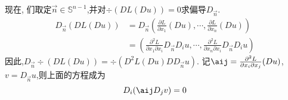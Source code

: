 现在, 们取定$\vec{n} \in \mathbb{S}^{n-1}$,并对$\div(DL(Du))=0$求偏导$D_{\vec{n}}$.
\begin{equation}
    \begin{split}
        D_{\vec{n}}(DL(Du))
        &=D_{\vec{n}}(\frac{\partial L}{\partial x_1}(Du),\cdots,\frac{\partial L}{\partial x_n}(Du))\\
        &=(\frac{\partial^2 L}{\partial x_1 \partial x_i} D_{\vec{n}}D_iu,\cdots,\frac{\partial^2 L}{\partial x_n \partial x_i} D_{\vec{n}}D_iu)
    \end{split}
\end{equation}
因此,$D_{\vec{n}}\div(DL(Du))=\div(D^2L(Du)DD_{\vec{n}}u)$. 记$\aij=\frac{\partial^2L}{\partial x_i \partial x_j}(Du)$, $v=D_{\vec{n}}u$,则上面的方程成为 
\begin{equation}
    D_i(\aij D_j v)=0
\end{equation}
